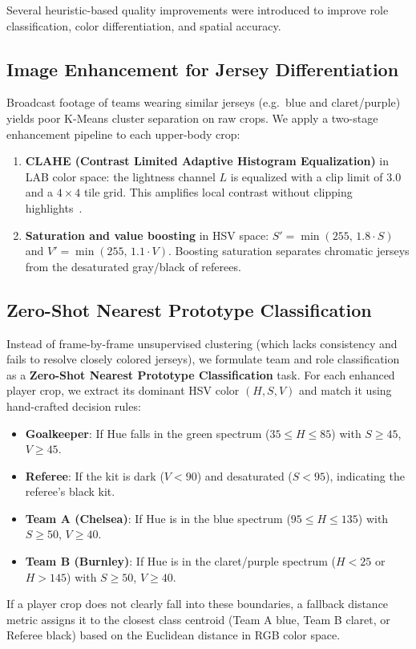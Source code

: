 \documentclass[11pt]{article}
\begin{document}
Several heuristic-based quality improvements were introduced to improve role classification, color differentiation, and spatial accuracy.

\subsection{Image Enhancement for Jersey Differentiation}

Broadcast footage of teams wearing similar jerseys (e.g.\ blue and claret/purple) yields poor K-Means cluster separation on raw crops. We apply a two-stage enhancement pipeline to each upper-body crop:

\begin{enumerate}
    \item \textbf{CLAHE (Contrast Limited Adaptive Histogram Equalization)} in LAB color space: the lightness channel $L$ is equalized with a clip limit of 3.0 and a $4 \times 4$ tile grid. This amplifies local contrast without clipping highlights~.
    \item \textbf{Saturation and value boosting} in HSV space: $S' = \min(255, \, 1.8 \cdot S)$ and $V' = \min(255, \, 1.1 \cdot V)$. Boosting saturation separates chromatic jerseys from the desaturated gray/black of referees.
\end{enumerate}

\subsection{Zero-Shot Nearest Prototype Classification}
\label{sec:heuristics}

Instead of frame-by-frame unsupervised clustering (which lacks consistency and fails to resolve closely colored jerseys), we formulate team and role classification as a \textbf{Zero-Shot Nearest Prototype Classification} task. For each enhanced player crop, we extract its dominant HSV color $(H, S, V)$ and match it using hand-crafted decision rules:
\begin{itemize}
    \item \textbf{Goalkeeper}: If Hue falls in the green spectrum ($35 \leq H \leq 85$) with $S \geq 45$, $V \geq 45$.
    \item \textbf{Referee}: If the kit is dark ($V < 90$) and desaturated ($S < 95$), indicating the referee's black kit.
    \item \textbf{Team A (Chelsea)}: If Hue is in the blue spectrum ($95 \leq H \leq 135$) with $S \geq 50$, $V \geq 40$.
    \item \textbf{Team B (Burnley)}: If Hue is in the claret/purple spectrum ($H < 25$ or $H > 145$) with $S \geq 50$, $V \geq 40$.
\end{itemize}
If a player crop does not clearly fall into these boundaries, a fallback distance metric assigns it to the closest class centroid (Team A blue, Team B claret, or Referee black) based on the Euclidean distance in RGB color space.
\end{document}
